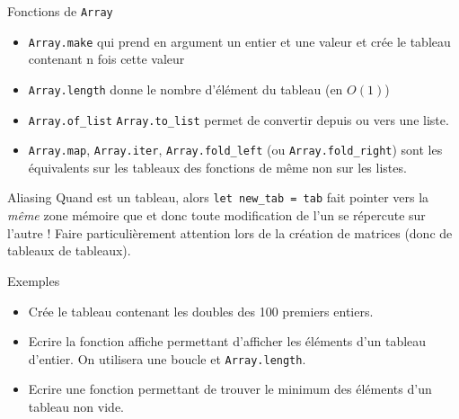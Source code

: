 \documentclass[10pt]{beamer}
\begin{document}
\begin{frame}[fragile]{\Ctitle}{\stitle}
    \begin{block}{Fonctions de {\tt Array}}
    \begin{itemize}
        \item<1-> \texttt{Array.make} qui prend en argument un entier et une valeur et crée le tableau contenant n fois cette valeur
        \item<2-> \texttt{Array.length} donne le nombre d'élément du tableau (en $O(1)$)
        \item<3-> \texttt{Array.of_list} \texttt{Array.to_list} permet de convertir depuis ou vers une liste.
        \item<4-> \texttt{Array.map}, \texttt{Array.iter}, \texttt{Array.fold_left} (ou \texttt{Array.fold_right}) sont les équivalents sur les tableaux des fonctions de même non sur les listes.
    \end{itemize}
\end{block}
    \begin{block}{Aliasing}
        \textcolor{BrickRed}{\small \danger \;} Quand  est un tableau, alors \texttt{let new_tab = tab} fait pointer  vers la \textit{même} zone mémoire que  et donc toute modification de l'un se répercute sur l'autre ! 
        Faire particulièrement attention lors de la création de matrices (donc de tableaux de tableaux).
    \end{block}
\end{frame}

\begin{frame}[fragile]{\Ctitle}{\stitle}
    \begin{exampleblock}{Exemples}
    \begin{itemize}
        \item<1-> Crée le tableau contenant les doubles des 100 premiers entiers.
        \item<2-> Ecrire la fonction affiche permettant d'afficher les éléments d'un tableau d'entier. On utilisera une boucle  et \texttt{Array.length}.
        \item<3-> Ecrire une fonction permettant de trouver le minimum des éléments d'un tableau non vide. 
    \end{itemize}
    \end{exampleblock}
\end{frame}
\end{document}
